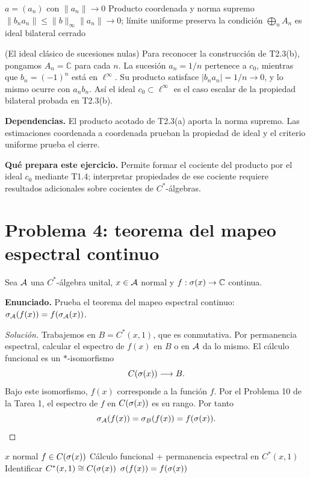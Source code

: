 \proofdiagram
{$a=(a_n)$ con $\|a_n\|\to0$}
{Producto coordenada y norma supremo}
{$\|b_na_n\|\le\|b\|_\infty\|a_n\|\to0$; límite uniforme preserva la condición}
{$\bigoplus_n A_n$ es ideal bilateral cerrado}

\begin{cthejemplo}{(El ideal clásico de sucesiones nulas)}
Para reconocer la construcción de T2.3(b), pongamos $A_n=\mathbb C$ para cada $n$.
La sucesión $a_n=1/n$ pertenece a $c_0$, mientras que $b_n=(-1)^n$ está en $\ell^\infty$.
Su producto satisface $|b_na_n|=1/n\to0$, y lo mismo ocurre con $a_nb_n$.
Así el ideal $c_0\subset\ell^\infty$ es el caso escalar de la propiedad bilateral probada en T2.3(b).
\end{cthejemplo}

\noindent\textbf{Dependencias.} El producto acotado de T2.3(a) aporta la norma supremo. Las estimaciones coordenada a coordenada prueban la propiedad de ideal y el criterio uniforme prueba el cierre.

\noindent\textbf{Qué prepara este ejercicio.} Permite formar el cociente del producto por el ideal $c_0$ mediante T1.4; interpretar propiedades de ese cociente requiere resultados adicionales sobre cocientes de $C^*$-álgebras.

\section{Problema 4: teorema del mapeo espectral continuo}

Sea $\mathcal A$ una $C^*$-álgebra unital, $x\in\mathcal A$ normal y $f:\sigma(x)\to\mathbb C$ continua.

\noindent\textbf{Enunciado.} Prueba el teorema del mapeo espectral continuo: $\sigma_\mathcal A(f(x))=f(\sigma_\mathcal A(x))$.

\begin{proof}[Solución]
Trabajemos en $B=C^*(x,1)$, que es conmutativa. Por permanencia espectral, calcular el espectro de
$f(x)$ en $B$ o en $\mathcal A$ da lo mismo. El cálculo funcional es un $*$-isomorfismo
\[
 C(\sigma(x))\longrightarrow B.
\]
Bajo este isomorfismo, $f(x)$ corresponde a la función $f$. Por el Problema 10 de la Tarea 1, el
espectro de $f$ en $C(\sigma(x))$ es su rango. Por tanto
\[
 \sigma_\mathcal A(f(x))=\sigma_B(f(x))=f(\sigma(x)).
\]
\end{proof}

\proofdiagrambranch
{$x$ normal}
{$f\in C(\sigma(x))$}
{Cálculo funcional + permanencia espectral en $C^*(x,1)$}
{Identificar $C^*(x,1)\cong C(\sigma(x))$}
{$\sigma(f(x))=f(\sigma(x))$}

